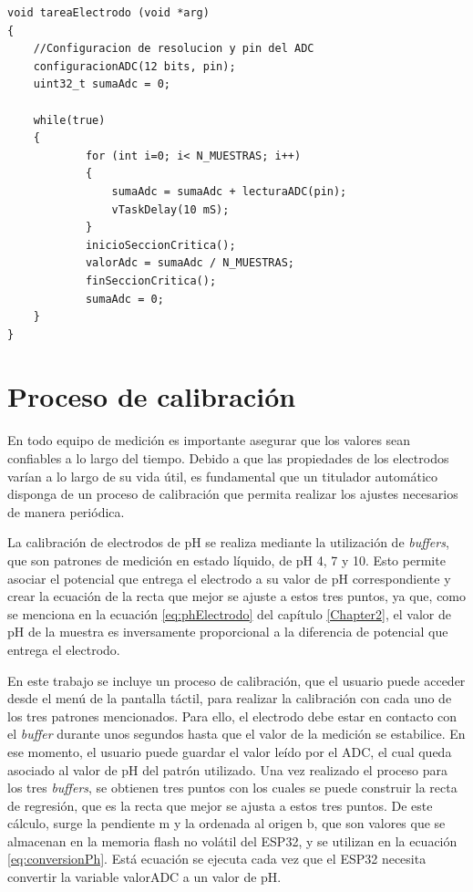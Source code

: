 \begin{lstlisting}[label=cod:tareaElectrodo,caption=Pseudocódigo de la tarea de medición de pH.]
void tareaElectrodo (void *arg)
{
    //Configuracion de resolucion y pin del ADC
    configuracionADC(12 bits, pin);
    uint32_t sumaAdc = 0;

    while(true)
    {
    		for (int i=0; i< N_MUESTRAS; i++)
    		{
        		sumaAdc = sumaAdc + lecturaADC(pin);  
        		vTaskDelay(10 mS);
    		} 
    		inicioSeccionCritica(); 
    		valorAdc = sumaAdc / N_MUESTRAS;
    		finSeccionCritica();
    		sumaAdc = 0;
    }
}
\end{lstlisting}

\section{Proceso de calibración}

En todo equipo de medición es importante asegurar que los valores sean confiables a lo largo del tiempo. Debido a que las propiedades de los electrodos varían a lo largo de su vida útil, es fundamental que un titulador automático disponga de un proceso de calibración que permita realizar los ajustes necesarios de manera periódica.

La calibración de electrodos de pH se realiza mediante la utilización de \textit{buffers}, que son patrones de medición en estado líquido, de pH 4, 7 y 10. Esto permite asociar el potencial que entrega el electrodo a su valor de pH correspondiente y crear la ecuación de la recta que mejor se ajuste a estos tres puntos, ya que, como se menciona en la ecuación \ref{eq:phElectrodo} del capítulo \ref{Chapter2}, el valor de pH de la muestra es inversamente proporcional a la diferencia de potencial que entrega el electrodo.

En este trabajo se incluye un proceso de calibración, que el usuario puede acceder desde el menú de la pantalla táctil, para realizar la calibración con cada uno de los tres patrones mencionados. Para ello, el electrodo debe estar en contacto con el \textit{buffer} durante unos segundos hasta que el valor de la medición se estabilice. En ese momento, el usuario puede guardar el valor leído por el ADC, el cual queda asociado al valor de pH del patrón utilizado. Una vez realizado el proceso para los tres \textit{buffers}, se obtienen tres puntos con los cuales se puede construir la recta de regresión, que es la recta que mejor se ajusta a estos tres puntos. De este cálculo, surge la pendiente m y la ordenada al origen b, que son valores que se almacenan en la memoria flash no volátil del ESP32, y se utilizan en la ecuación \ref{eq:conversionPh}. Está ecuación se ejecuta cada vez que el ESP32 necesita convertir la variable valorADC a un valor de pH.

